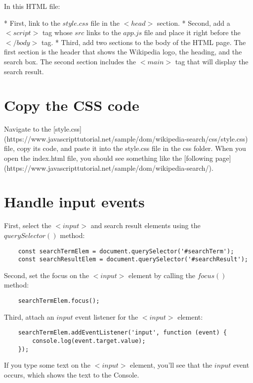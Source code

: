 \documentclass[11pt]{article}
\begin{document}
In this HTML file:

* First, link to the $style.css$ file in the $<head>$ section.
* Second, add a $<script>$ tag whose $src$ links to the $app.js$ file
and place it right before the $</body>$ tag.
* Third, add two sections to the body of the HTML page.
The first section is the header that shows the Wikipedia logo, the
heading, and the search box. The second section includes the $<main>$
tag that will display the search result.

\section*{Copy the CSS code}

Navigate to the [style.css](https://www.javascripttutorial.net/sample/dom/wikipedia-search/css/style.css) file, copy its code, and paste it into the
style.css file in the css folder. When you open the index.html file,
you should see something like the [following page](https://www.javascripttutorial.net/sample/dom/wikipedia-search/).

\section*{Handle input events}

First, select the $<input>$ and search result elements using the
$querySelector()$ method:

\begin{lstlisting}
    const searchTermElem = document.querySelector('#searchTerm');
    const searchResultElem = document.querySelector('#searchResult');
\end{lstlisting}

\noindent
Second, set the focus on the $<input>$ element by calling the
$focus()$ method:

\begin{lstlisting}
    searchTermElem.focus();
\end{lstlisting}

\noindent
Third, attach an $input$ event listener for the $<input>$ element:

\begin{lstlisting}
    searchTermElem.addEventListener('input', function (event) {
        console.log(event.target.value);
    });
\end{lstlisting}

\noindent
If you type some text on the $<input>$ element, you'll see that the
$input$ event occurs, which shows the text to the Console.
\newline
\end{document}
